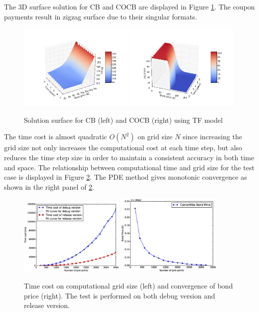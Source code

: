 \documentclass[12pt]{article}
\begin{document}
The 3D surface solution for CB and COCB are displayed in Figure \ref{fig:surf}. The coupon payments result in zigzag surface due to their singular formats.
\begin{figure}[!htbp]
\includegraphics[width=0.49\textwidth]{Figures/CBsurf}
\includegraphics[width=0.49\textwidth]{Figures/COCBsurf}
\caption{Solution surface for CB (left) and COCB (right) using TF model}
\label{fig:surf}
\end{figure}

The time cost is almost quadratic $O(N^2)$ on grid size $N$ since increasing the grid size not only increases the computational cost at each time step, but also reduces the time step size in order to maintain a consistent accuracy in both time and space. The relationship between computational time and grid size for the test case is displayed in Figure \ref{fig:time_cost}. The PDE method gives monotonic convergence as shown in the right panel of \ref{fig:time_cost}.
\begin{figure}[!htbp]
\centering
\includegraphics[width=0.45\textwidth]{Figures/timecost}
\includegraphics[width=0.45\textwidth]{Figures/converge}
\caption{Time cost on computational grid size (left) and convergence of bond price (right). The test is performed on both debug version and release version.}
\label{fig:time_cost}
\end{figure}
\end{document}
